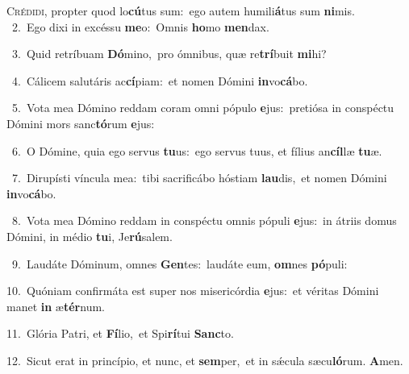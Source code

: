\lettrine{\initial\textcolor{\initialcolor}{C}}{rédidi,} propter quod lo\-\textbf{cú}\-tus sum:~\star ego autem humili\-\textbf{á}\-tus sum \textbf{ni}\-mis.\\
{\numbfont\textcolor{\numbcolor}{~2.}}~Ego dixi in excéssu \textbf{me}\-o:~\star Omnis \textbf{ho}\-mo \textbf{men}\-dax.\par
{\numbfont\textcolor{\numbcolor}{~3.}}~Quid retríbuam \textbf{Dó}\-mino,~\star pro ómnibus, quæ re\-\textbf{trí}\-buit \textbf{mi}\-hi?\par
{\numbfont\textcolor{\numbcolor}{~4.}}~Cálicem salutáris ac\-\textbf{cí}\-piam:~\star et nomen Dómini \textbf{in}\-vo\-\textbf{cá}\-bo.\par
{\numbfont\textcolor{\numbcolor}{~5.}}~Vota mea Dómino reddam coram omni pópulo \textbf{e}\-jus:~\star pretiósa in conspéctu Dómini mors sanc\-\textbf{tó}\-rum \textbf{e}\-jus:\par
{\numbfont\textcolor{\numbcolor}{~6.}}~O Dómine, quia ego servus \textbf{tu}\-us:~\star ego servus tuus, et fílius an\-\textbf{cíl}\-læ \textbf{tu}\-æ.\par
{\numbfont\textcolor{\numbcolor}{~7.}}~Dirupísti víncula mea:~\dagger tibi sacrificábo hóstiam \textbf{lau}\-dis,~\star et nomen Dómini \textbf{in}\-vo\-\textbf{cá}\-bo.\par
{\numbfont\textcolor{\numbcolor}{~8.}}~Vota mea Dómino reddam in conspéctu omnis pópuli \textbf{e}\-jus:~\star in átriis domus Dómini, in médio \textbf{tu}\-i, Je\-\textbf{rú}\-salem.\par
{\numbfont\textcolor{\numbcolor}{~9.}}~Laudáte Dóminum, omnes \textbf{Gen}\-tes:~\star laudáte eum, \textbf{om}\-nes \textbf{pó}\-puli:\par
{\numbfont\textcolor{\numbcolor}{10.}}~Quóniam confirmáta est super nos misericórdia \textbf{e}\-jus:~\star et véritas Dómini manet \textbf{in} æ\-\textbf{tér}\-num.\par
{\numbfont\textcolor{\numbcolor}{11.}}~Glória Patri, et \textbf{Fí}\-lio,~\star et Spi\-\textbf{rí}\-tui \textbf{Sanc}\-to.\par
{\numbfont\textcolor{\numbcolor}{12.}}~Sicut erat in princípio, et nunc, et \textbf{sem}\-per,~\star et in sǽcula sæcu\-\textbf{ló}\-rum. \textbf{A}\-men.\par
